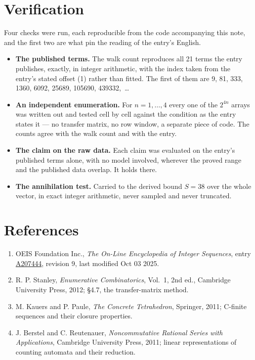 \documentclass[11pt]{article}
\theoremstyle{definition}
\begin{document}
\section{Verification}

Four checks were run, each reproducible from the code accompanying this note, and the first two are what pin the reading of the entry's English.

\begin{itemize}

\item {\bfseries The published terms.} The walk count reproduces all 21 terms the entry publishes, exactly, in integer arithmetic, with the index taken from the entry's stated offset (1) rather than fitted. The first of them are 9, 81, 333, 1360, 6092, 25689, 105690, 439332,~\dots

\item {\bfseries An independent enumeration.} For $n = 1,\dots,4$ every one of the $2^{4n}$ arrays was written out and tested cell by cell against the condition as the entry states it --- no transfer matrix, no row window, a separate piece of code. The counts agree with the walk count and with the entry.

\item {\bfseries The claim on the raw data.} Each claim was evaluated on the entry's published terms alone, with no model involved, wherever the proved range and the published data overlap. It holds there.

\item {\bfseries The annihilation test.} Carried to the derived bound $S = 38$ over the whole vector, in exact integer arithmetic, never sampled and never truncated.

\end{itemize}

\section{References}

\begin{enumerate}

\item OEIS Foundation Inc., \emph{The On-Line Encyclopedia of Integer Sequences}, entry \href{https://oeis.org/A207444}{A207444}, revision 9, last modified Oct 03 2025.

\item R. P. Stanley, \emph{Enumerative Combinatorics}, Vol.~1, 2nd ed., Cambridge University Press, 2012; \S4.7, the transfer-matrix method.

\item M. Kauers and P. Paule, \emph{The Concrete Tetrahedron}, Springer, 2011; C-finite sequences and their closure properties.

\item J. Berstel and C. Reutenauer, \emph{Noncommutative Rational Series with Applications}, Cambridge University Press, 2011; linear representations of counting automata and their reduction.

\end{enumerate}
\end{document}
